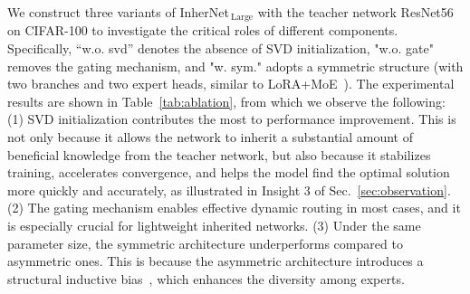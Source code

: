 \documentclass{article} %
\begin{document}
We construct three variants of InherNet$_{\ \text{Large}}$ with the teacher network ResNet56 on CIFAR-100 to investigate the critical roles of different components. Specifically, ``w.o. svd'' denotes the absence of SVD initialization, "w.o. gate" removes the gating mechanism, and "w. sym." adopts a symmetric structure (with two branches and two expert heads, similar to LoRA+MoE~\citep{liu2024moemeetsllmsparameter}). The experimental results are shown in Table~\ref{tab:ablation}, from which we observe the following: (1) SVD initialization contributes the most to performance improvement. This is not only because it allows the network to inherit a substantial amount of beneficial knowledge from the teacher network, but also because it stabilizes training, accelerates convergence, and helps the model find the optimal solution more quickly and accurately, as illustrated in Insight 3 of Sec.~\ref{sec:observation}. (2) The gating mechanism enables effective dynamic routing in most cases, and it is especially crucial for lightweight inherited networks. (3) Under the same parameter size, the symmetric architecture underperforms compared to asymmetric ones. This is because the asymmetric architecture introduces a structural inductive bias~\citep{parton2020mixtures}, which enhances the diversity among experts.




\end{document}
